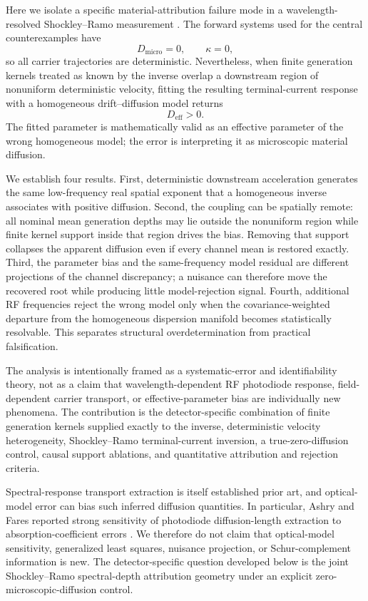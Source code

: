 \documentclass[aps,pra,twocolumn,superscriptaddress,nofootinbib]{revtex4-2}
\newcommand{\Deff}{D_{\mathrm{eff}}}
\newcommand{\Dmicro}{D_{\mathrm{micro}}}
\begin{document}
Here we isolate a specific material-attribution failure mode in a wavelength-resolved Shockley--Ramo measurement \cite{shockley1938,ramo1939}. The forward systems used for the central counterexamples have
\begin{equation}
\Dmicro=0,
\qquad
\kappa=0,
\end{equation}
so all carrier trajectories are deterministic. Nevertheless, when finite generation kernels treated as known by the inverse overlap a downstream region of nonuniform deterministic velocity, fitting the resulting terminal-current response with a homogeneous drift--diffusion model returns
\begin{equation}
\Deff>0.
\end{equation}
The fitted parameter is mathematically valid as an effective parameter of the wrong homogeneous model; the error is interpreting it as microscopic material diffusion.

We establish four results. First, deterministic downstream acceleration generates the same low-frequency real spatial exponent that a homogeneous inverse associates with positive diffusion. Second, the coupling can be spatially remote: all nominal mean generation depths may lie outside the nonuniform region while finite kernel support inside that region drives the bias. Removing that support collapses the apparent diffusion even if every channel mean is restored exactly. Third, the parameter bias and the same-frequency model residual are different projections of the channel discrepancy; a nuisance can therefore move the recovered root while producing little model-rejection signal. Fourth, additional RF frequencies reject the wrong model only when the covariance-weighted departure from the homogeneous dispersion manifold becomes statistically resolvable. This separates structural overdetermination from practical falsification.

The analysis is intentionally framed as a systematic-error and identifiability theory, not as a claim that wavelength-dependent RF photodiode response, field-dependent carrier transport, or effective-parameter bias are individually new phenomena. The contribution is the detector-specific combination of finite generation kernels supplied exactly to the inverse, deterministic velocity heterogeneity, Shockley--Ramo terminal-current inversion, a true-zero-diffusion control, causal support ablations, and quantitative attribution and rejection criteria.

Spectral-response transport extraction is itself established prior art, and optical-model error can bias such inferred diffusion quantities. In particular, Ashry and Fares reported strong sensitivity of photodiode diffusion-length extraction to absorption-coefficient errors \cite{ashry2003diffusion}. We therefore do not claim that optical-model sensitivity, generalized least squares, nuisance projection, or Schur-complement information is new. The detector-specific question developed below is the joint Shockley--Ramo spectral-depth attribution geometry under an explicit zero-microscopic-diffusion control.
\end{document}
